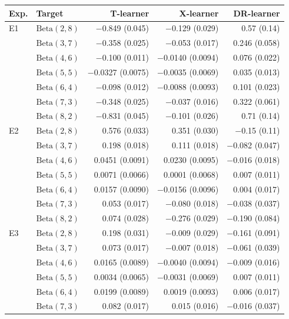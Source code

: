 \begin{tabular}{llrrr}
\hline
Exp. & Target & T-learner & X-learner & DR-learner \\
\hline
E1 & $\mathrm{Beta}(2,8)$ & $-$0.849 (0.045) & $-$0.129 (0.029) & 0.57 (0.14) \\
 & $\mathrm{Beta}(3,7)$ & $-$0.358 (0.025) & $-$0.053 (0.017) & 0.246 (0.058) \\
 & $\mathrm{Beta}(4,6)$ & $-$0.100 (0.011) & $-$0.0140 (0.0094) & 0.076 (0.022) \\
 & $\mathrm{Beta}(5,5)$ & $-$0.0327 (0.0075) & $-$0.0035 (0.0069) & 0.035 (0.013) \\
 & $\mathrm{Beta}(6,4)$ & $-$0.098 (0.012) & $-$0.0088 (0.0093) & 0.101 (0.023) \\
 & $\mathrm{Beta}(7,3)$ & $-$0.348 (0.025) & $-$0.037 (0.016) & 0.322 (0.061) \\
 & $\mathrm{Beta}(8,2)$ & $-$0.831 (0.045) & $-$0.101 (0.026) & 0.71 (0.14) \\[3pt]
E2 & $\mathrm{Beta}(2,8)$ & 0.576 (0.033) & 0.351 (0.030) & $-$0.15 (0.11) \\
 & $\mathrm{Beta}(3,7)$ & 0.198 (0.018) & 0.111 (0.018) & $-$0.082 (0.047) \\
 & $\mathrm{Beta}(4,6)$ & 0.0451 (0.0091) & 0.0230 (0.0095) & $-$0.016 (0.018) \\
 & $\mathrm{Beta}(5,5)$ & 0.0071 (0.0066) & 0.0001 (0.0068) & 0.007 (0.011) \\
 & $\mathrm{Beta}(6,4)$ & 0.0157 (0.0090) & $-$0.0156 (0.0096) & 0.004 (0.017) \\
 & $\mathrm{Beta}(7,3)$ & 0.053 (0.017) & $-$0.080 (0.018) & $-$0.038 (0.037) \\
 & $\mathrm{Beta}(8,2)$ & 0.074 (0.028) & $-$0.276 (0.029) & $-$0.190 (0.084) \\[3pt]
E3 & $\mathrm{Beta}(2,8)$ & 0.198 (0.031) & $-$0.009 (0.029) & $-$0.161 (0.091) \\
 & $\mathrm{Beta}(3,7)$ & 0.073 (0.017) & $-$0.007 (0.018) & $-$0.061 (0.039) \\
 & $\mathrm{Beta}(4,6)$ & 0.0165 (0.0089) & $-$0.0040 (0.0094) & $-$0.009 (0.016) \\
 & $\mathrm{Beta}(5,5)$ & 0.0034 (0.0065) & $-$0.0031 (0.0069) & 0.007 (0.011) \\
 & $\mathrm{Beta}(6,4)$ & 0.0199 (0.0089) & 0.0019 (0.0093) & 0.006 (0.017) \\
 & $\mathrm{Beta}(7,3)$ & 0.082 (0.017) & 0.015 (0.016) & $-$0.016 (0.037) \\

\end{tabular}
